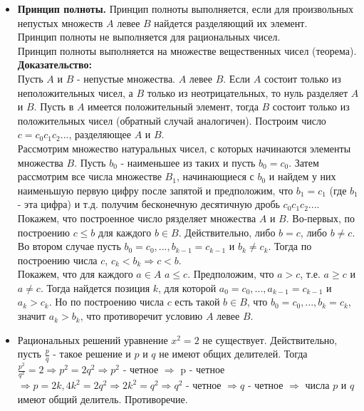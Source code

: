 \documentclass[12pt,a4paper]{article}
\begin{document}
\begin{itemize}
\item \textbf{Принцип полноты. }
Принцип полноты выполняется, если для произвольных непустых множеств $A$ левее $B$ найдется разделяющий их элемент. \\
Принцип полноты не выполняется для рациональных чисел. \\
Принцип полноты выполняется на множестве вещественных чисел (теорема).\\
\textbf{Доказательство:} \\
Пусть $A$ и $B$ - непустые множества.  $A$ левее $B$. Если $A$ состоит только из неположительных чисел, а $B$ только из неотрицательных, то нуль разделяет $A$ и $B$. Пусть в $A$ имеется положительный элемент, тогда $B$ состоит только из положительных чисел (обратный случай аналогичен). Построим число $c = c_0c_1c_2...$, разделяющее $A$ и $B$. \\
Рассмотрим множество натуральных чисел, с которых начинаются элементы множества $B$. Пусть $b_0$ - наименьшее из таких и пусть $b_0 = c_0$. Затем рассмотрим все числа множестве $B_1$, начинающиеся с $b_0$ и найдем у них наименьшую первую цифру после запятой и предположим, что $b_1=c_1$ (где $b_1$ - эта цифра) и т.д. получим бесконечную десятичную дробь $c_0c_1c_2...$. Покажем, что построенное число рязделяет множества $A$ и $B$. Во-первых, по построению $c \leq b$ для каждого $b \in B$. Действительно, либо $b = c$, либо $b \neq c$. Во втором случае пусть $b_0 = c_0, ..., b_{k-1} = c_{k-1}$ и $b_k \neq c_k$. Тогда по построению числа $c$, $c_k < b_k \Rightarrow c < b$. \\
Покажем, что для каждого $a \in A $ $a \leq c$. Предположим, что $a > c$, т.е. $a \geq c$ и $a \neq c$. Тогда найдется позиция $k$, для которой $a_0=c_0, ..., a_{k-1}=c_{k-1}$ и $a_k > c_k$. Но по построению числа $c$ есть такой $b \in B$, что $b_0 = c_0, ..., b_k=c_k$, значит $a_k > b_k$, что противоречит условию $A$ левее $B$. 

\item Рациональных решений уравнение $x^2=2$ не существует. Действительно, пусть $\frac{p}{q}$ - такое решение и $p$ и $q$ не имеют общих делителей. Тогда $\frac{p^2}{q^2} = 2 \Rightarrow p^2=2q^2 \Rightarrow p^2$ - четное $\Rightarrow$ p - четное $\Rightarrow p=2k, 4k^2=2q^2 \Rightarrow 2k^2 = q^2 \Rightarrow q^2$ - четное $\Rightarrow q$ - четное $\Rightarrow$ числа $p$ и $q$ имеют общий делитель. Противоречие.
\end{itemize}
\end{document}

